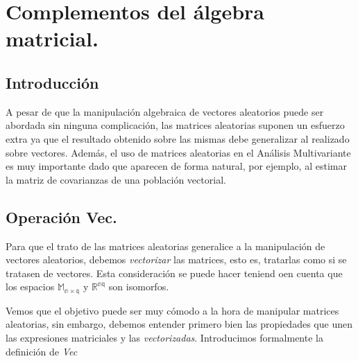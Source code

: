 \documentclass{article}
\theoremstyle{theorem-style}  %
\theoremstyle{definition-style}
\theoremstyle{example-style}
\theoremstyle{exercise-style}
\begin{document}
 \maketitle



\newpage
\tableofcontents
\newpage

\section{Complementos del álgebra matricial.}

\subsection{Introducción}

A pesar de que la manipulación algebraica de vectores aleatorios puede ser abordada sin ninguna complicación, las matrices aleatorias suponen un esfuerzo extra ya que el resultado obtenido sobre las mismas debe generalizar al realizado sobre vectores. Además, el uso de matrices aleatorias en el Análisis Multivariante es muy importante dado que aparecen de forma natural, por ejemplo, al estimar la matriz de covarianzas de una población vectorial.

\subsection{Operación Vec.}

Para que el trato de las matrices aleatorias generalice a la manipulación de vectores aleatorios, debemos \textit{vectorizar} las matrices, esto es, tratarlas como si se tratasen de vectores. Esta consideración se puede hacer teniend oen cuenta que los espacios $\mathbb{M_{n \times q}}$ y $\mathbb{R^{nq}}$ son isomorfos. 

Vemos que el objetivo puede ser muy cómodo a la hora de manipular matrices aleatorias, sin embargo, debemos entender primero bien las propiedades que unen las expresiones matriciales y las \textit{vectorizadas}. Introducimos formalmente la definición de \textit{Vec}

\vspace{0.2cm}
\end{document}
